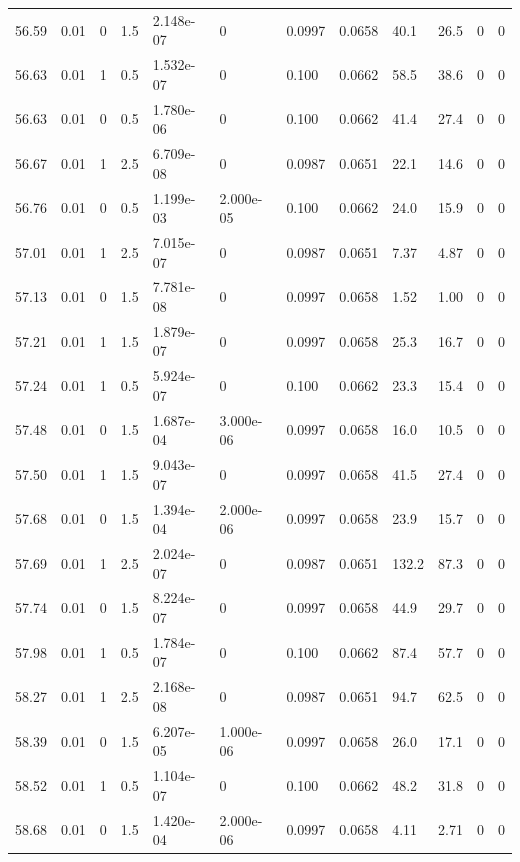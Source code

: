 \documentclass[preview]{standalone}
\begin{document}
{{{{{{{{{{{{{\begin{tabular}{L{1.2cm}C{1.2cm} C{0.3cm}C{0.5cm} C{1.4cm}C{1.4cm} C{1.4cm}C{1.4cm} C{1.6cm}C{1.6cm} C{1.6cm}C{1.6cm}}
  56.59  &  0.01  & 0     & 1.5 &  2.148e-07  & 0  &  0.0997&   0.0658& 40.1 & 26.5   &  0 & 0  \\ 
  56.63  &  0.01  & 1     & 0.5 &  1.532e-07  & 0  &  0.100&   0.0662& 58.5 & 38.6   &  0 & 0  \\ 
  56.63  &  0.01  & 0     & 0.5 &  1.780e-06  & 0  &  0.100&   0.0662& 41.4 & 27.4   &  0 & 0  \\ 
  56.67  &  0.01  & 1     & 2.5 &  6.709e-08  & 0  &  0.0987&   0.0651& 22.1 & 14.6   &  0 & 0  \\ 
  56.76  &  0.01  & 0     & 0.5 &  1.199e-03  & 2.000e-05  &  0.100&   0.0662& 24.0 & 15.9   &  0 & 0  \\ 
  57.01  &  0.01  & 1     & 2.5 &  7.015e-07  & 0  &  0.0987&   0.0651& 7.37 & 4.87   &  0 & 0  \\ 
  57.13  &  0.01  & 0     & 1.5 &  7.781e-08  & 0  &  0.0997&   0.0658& 1.52 & 1.00   &  0 & 0  \\ 
  57.21  &  0.01  & 1     & 1.5 &  1.879e-07  & 0  &  0.0997&   0.0658& 25.3 & 16.7   &  0 & 0  \\ 
  57.24  &  0.01  & 1     & 0.5 &  5.924e-07  & 0  &  0.100&   0.0662& 23.3 & 15.4   &  0 & 0  \\ 
  57.48  &  0.01  & 0     & 1.5 &  1.687e-04  & 3.000e-06  &  0.0997&   0.0658& 16.0 & 10.5   &  0 & 0  \\ 
  57.50  &  0.01  & 1     & 1.5 &  9.043e-07  & 0  &  0.0997&   0.0658& 41.5 & 27.4   &  0 & 0  \\ 
  57.68  &  0.01  & 0     & 1.5 &  1.394e-04  & 2.000e-06  &  0.0997&   0.0658& 23.9 & 15.7   &  0 & 0  \\ 
  57.69  &  0.01  & 1     & 2.5 &  2.024e-07  & 0  &  0.0987&   0.0651& 132.2 & 87.3   &  0 & 0  \\ 
  57.74  &  0.01  & 0     & 1.5 &  8.224e-07  & 0  &  0.0997&   0.0658& 44.9 & 29.7   &  0 & 0  \\ 
  57.98  &  0.01  & 1     & 0.5 &  1.784e-07  & 0  &  0.100&   0.0662& 87.4 & 57.7   &  0 & 0  \\ 
  58.27  &  0.01  & 1     & 2.5 &  2.168e-08  & 0  &  0.0987&   0.0651& 94.7 & 62.5   &  0 & 0  \\ 
  58.39  &  0.01  & 0     & 1.5 &  6.207e-05  & 1.000e-06  &  0.0997&   0.0658& 26.0 & 17.1   &  0 & 0  \\ 
  58.52  &  0.01  & 1     & 0.5 &  1.104e-07  & 0  &  0.100&   0.0662& 48.2 & 31.8   &  0 & 0  \\ 
  58.68  &  0.01  & 0     & 1.5 &  1.420e-04  & 2.000e-06  &  0.0997&   0.0658& 4.11 & 2.71   &  0 & 0  \\ 

\end{tabular}}}}}}}}}}}}}}
\end{document}
